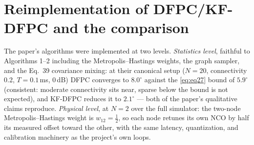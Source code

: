\documentclass[10pt]{article}
\begin{document}
\section{Reimplementation of DFPC/KF-DFPC and the comparison}
\label{sec:compare}
The paper's algorithms were implemented at two levels.
\emph{Statistics level}, faithful to Algorithms 1--2 including the
Metropolis--Hastings weights, the graph sampler, and the Eq.~39
covariance mixing: at their canonical setup ($N{=}20$, connectivity 0.2,
$T{=}0.1$\,ms, 0\,dB) DFPC converges to $8.0^\circ$ against the
\eqref{eq:eq27} bound of $5.9^\circ$ (consistent: moderate connectivity
sits near, sparse below the bound is not expected), and KF-DFPC reduces
it to $2.1^\circ$ --- both of the paper's qualitative claims reproduce.
\emph{Physical level}, at $N{=}2$ over the full simulator: the two-node
Metropolis--Hastings weight is $w_{12}=\tfrac12$, so each node retunes
its own NCO by half its measured offset toward the other, with the same
latency, quantization, and calibration machinery as the project's own
loops.
\end{document}
